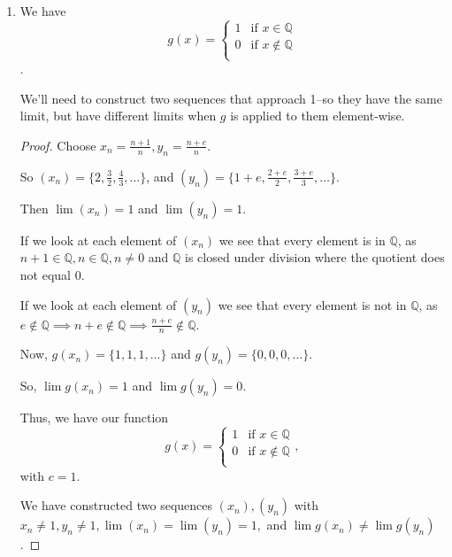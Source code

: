 \documentclass[12pt,letterpaper]{article}
\newcommand\e{e}
\begin{document}
\begin{enumerate}[label=Exercise 4.2.\arabic*]
\begin{enumerate}
\begin{proof}
            So we conclude by Corollary 4.2.5 that $\lim_{x \to 0} f(x)$ does not exist.
          \end{proof}
        \item
          We have
          \[
            g(x) =
            \begin{cases}
              1 & \text{if } x \in \mathbb{Q} \\
              0 & \text{if } x \notin \mathbb{Q} \\
            \end{cases}
          \].

          We'll need to construct two sequences that approach 1--so they have the same limit,
          but have different limits when $g$ is applied to them element-wise.

          \begin{proof}
            Choose $x_n = \frac{n + 1}{n}, y_n = \frac{n + \e}{n}$.

            So $(x_n) = \{2, \frac{3}{2}, \frac{4}{3}, \dots\}$,
            and $(y_n) = \{1 + \e, \frac{2 + \e}{2}, \frac{3 + \e}{3}, \dots\}$.

            Then $\lim(x_n) = 1$ and $\lim(y_n) = 1$.

            If we look at each element of $(x_n)$ we see that every element is in $\mathbb{Q}$,
            as $n + 1 \in \mathbb{Q}, n \in \mathbb{Q}, n \ne 0$ and $\mathbb{Q}$ is closed under division where the quotient does not equal 0.

            If we look at each element of $(y_n)$ we see that every element is not in $\mathbb{Q}$,
            as $\e \notin \mathbb{Q} \implies n + \e \notin \mathbb{Q} \implies \frac{n + \e}{n} \notin \mathbb{Q}$.

            Now, $g(x_n) = \{1, 1, 1, \dots\}$ and $g(y_n) = \{0, 0, 0, \dots\}$.

            So,  $\lim g(x_n) = 1$ and $\lim g(y_n) = 0$.

            Thus,
            we have our function
            \[
              g(x) =
              \begin{cases}
                1 & \text{if } x \in \mathbb{Q} \\
                0 & \text{if } x \notin \mathbb{Q} \\
              \end{cases},
            \]
            with $c = 1$.

            We have constructed two sequences $(x_n), (y_n)$
            with $x_n \ne 1, y_n \ne 1, \lim(x_n) = \lim(y_n) = 1,$
            and $\lim g(x_n) \ne \lim g(y_n)$.


\end{proof}
\end{enumerate}
\end{enumerate}
\end{document}

